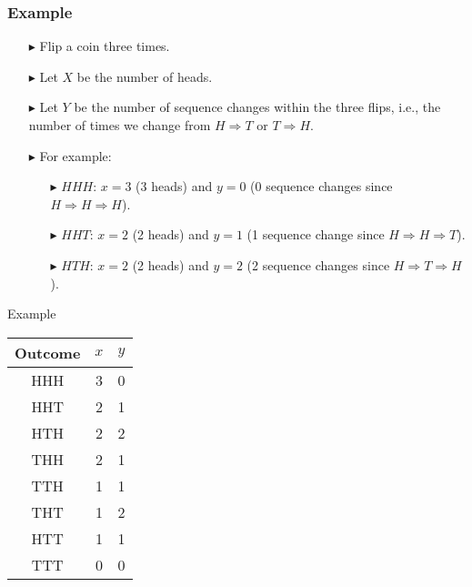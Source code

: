 \documentclass[12pt]{beamer}
\begin{document}
\begin{frame}
	\frametitle{Example}
	
	\begin{itemize}
		\item[\color{blue}$\blacktriangleright$]Flip a coin three times.
		\item[\color{blue}$\blacktriangleright$]Let $X$ be the number of heads.
		\item[\color{blue}$\blacktriangleright$]Let $Y$ be the number of sequence changes within the three flips, i.e., the number of times we change from $H \Rightarrow T$ or $T \Rightarrow H$.
		\item[\color{blue}$\blacktriangleright$]For example:
		\begin{itemize}
			\item[\color{blue}$\blacktriangleright$]$HHH$: $x = 3$ (3 heads) and $y = 0$ (0 sequence changes since $H \Rightarrow H \Rightarrow H$).
			\item[\color{blue}$\blacktriangleright$]$HHT$: $x = 2$ (2 heads) and $y = 1$ (1 sequence change since $H \Rightarrow H \Rightarrow T$).
			\item[\color{blue}$\blacktriangleright$]$HTH$: $x = 2$ (2 heads) and $y = 2$ (2 sequence changes since $H \Rightarrow T \Rightarrow H$).
		\end{itemize}
	\end{itemize}
	
\end{frame}
\begin{frame}{Example}
	
	\begin{center}
		\begin{tabular}{ccc}
			\toprule
			Outcome&$x$&$y$\\
			\hline
			HHH&3&0\\
			HHT&2&1\\
			HTH&2&2\\
			THH&2&1\\
			TTH&1&1\\
			THT&1&2\\
			HTT&1&1\\
			TTT&0&0\\
			\bottomrule
		\end{tabular}
		
	\end{center}
	
\end{frame}
\end{document}
